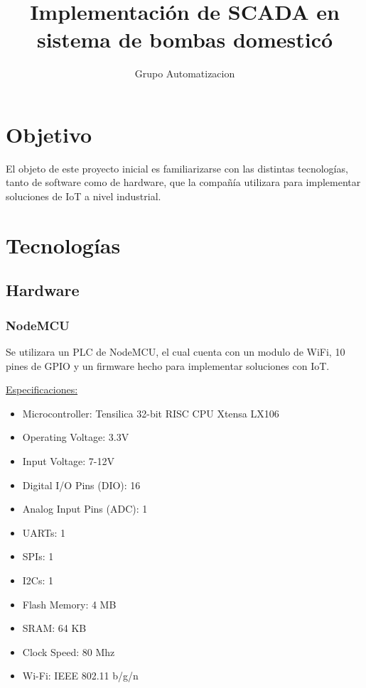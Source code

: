 \documentclass[12pt]{article}
\title{Implementación de SCADA en sistema de bombas domesticó}
\author{Grupo Automatizacion}
\begin{document}
	
	\maketitle
	
	\section{Objetivo}
	
	El objeto de este proyecto inicial es familiarizarse con las distintas tecnologías, tanto de software como de hardware, que la compañía utilizara para implementar soluciones de IoT a nivel industrial.
	
	\section{Tecnologías}
	
	\subsection{Hardware}
	
	\subsubsection{NodeMCU}
	
	Se utilizara un PLC de NodeMCU, el cual cuenta con un modulo de WiFi, 10 pines de GPIO y un firmware hecho para implementar soluciones con IoT.
	
	\vspace{5mm}
	
	\underline{Especificaciones:}
	
	\begin{itemize}
		\item Microcontroller: Tensilica 32-bit RISC CPU Xtensa LX106
		
		\item Operating Voltage: 3.3V
		
		\item Input Voltage: 7-12V
		
		\item Digital I/O Pins (DIO): 16
		
		\item Analog Input Pins (ADC): 1
		
		\item UARTs: 1
		
		\item SPIs: 1
		
		\item I2Cs: 1
		
		\item Flash Memory: 4 MB
		
		\item SRAM: 64 KB
		
		\item Clock Speed: 80 Mhz
		
		\item Wi-Fi: IEEE 802.11 b/g/n
	\end{itemize}
	
\end{document}
